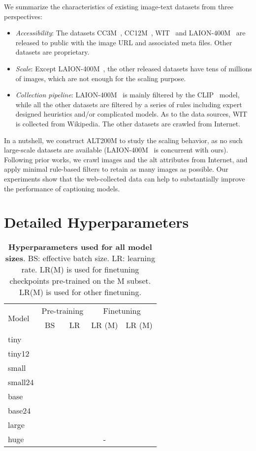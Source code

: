 We summarize the characteristics of existing image-text datasets from three perspectives:
\begin{itemize}
    \item \textit{Accessibility}: The datasets CC3M~\cite{sharma2018conceptual}, CC12M~\cite{changpinyo2021conceptual}, WIT~\cite{srinivasan2021wit} and LAION-400M~\cite{schuhmann2021laion} are released to public with the image URL and associated meta files. Other datasets are proprietary.
    \item \textit{Scale}: Except LAION-400M~\cite{schuhmann2021laion}, the other released datasets have tens of millions of images, which are not enough for the scaling purpose.
    \item \textit{Collection pipeline}: LAION-400M~\cite{schuhmann2021laion} is mainly filtered by the CLIP~\cite{radford2021learning} model, while all the other datasets are filtered by a series of rules including expert designed heuristics and/or complicated models. As to the data sources, WIT~\cite{srinivasan2021wit} is collected from Wikipedia. The other datasets are crawled from Internet. 
\end{itemize}

In a nutshell, we construct ALT200M to study the scaling behavior, as no such large-scale datasets are available (LAION-400M~\cite{schuhmann2021laion} is concurrent with ours). Following prior works, we crawl images and the alt attributes from Internet, and apply minimal rule-based filters to retain as many images as possible. Our experiments show that the web-collected data can help to substantially improve the performance of captioning models.

\section{Detailed Hyperparameters}

\begin{table}
\small
\centering
\begin{tabular}{l|cc|cc}
\toprule
\multirow{2}{*}{Model } & \multicolumn{2}{c|}{Pre-training} & \multicolumn{2}{c}{Finetuning}\\
 &  BS & LR & LR (M) & LR (M) \\
\midrule
tiny &  &   & &  \\
tiny12 &  &   &  & \\
small &  &   &  & \\
small24 &  &   &  & \\
base &  &   &  & \\
base24 &  &   &  & \\
large &  &   &  & \\
huge &  &   & - & \\
\bottomrule
\end{tabular}
\caption{\textbf{Hyperparameters used for all model sizes}. BS: effective batch size. LR: learning rate. LR(M) is used for finetuning checkpoints pre-trained on the M subset. LR(M) is used for other finetuning.}
\label{tab:hyperparam}
\end{table}

